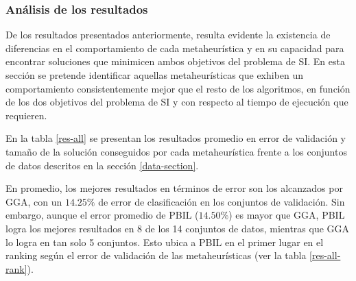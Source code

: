 \subsubsection{Análisis de los resultados}

De los resultados presentados anteriormente, resulta evidente la existencia de diferencias en el comportamiento de cada metaheurística y en su capacidad para encontrar soluciones que minimicen ambos objetivos del problema de SI. En esta sección se pretende identificar aquellas metaheurísticas que exhiben un comportamiento consistentemente mejor que el resto de los algoritmos, en función de los dos objetivos del problema de SI y con respecto al tiempo de ejecución que requieren.

En la tabla \ref{res-all} se presentan los resultados promedio en error de validación y tamaño de la solución conseguidos por cada metaheurística frente a los conjuntos de datos descritos en la sección \ref{data-section}.

En promedio, los mejores resultados en términos de error son los alcanzados por GGA, con un $14.25\%$ de error de clasificación en los conjuntos de validación. Sin embargo, aunque el error promedio de PBIL ($14.50\%$) es mayor que GGA, PBIL logra los mejores resultados en 8 de los 14 conjuntos de datos, mientras que GGA lo logra en tan solo 5 conjuntos. Esto ubica a PBIL en el primer lugar en el ranking según el error de validación de las metaheurísticas (ver la tabla \ref{res-all-rank}).

